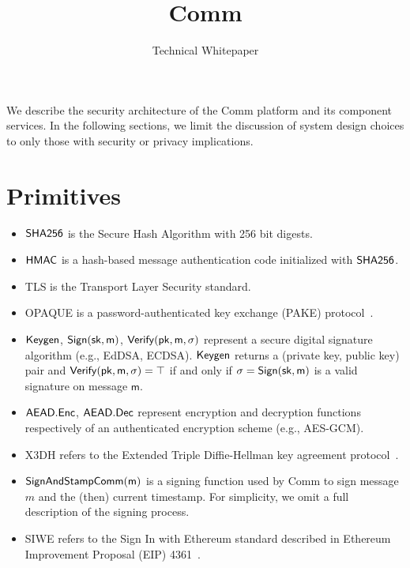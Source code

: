 \documentclass{article}
\title{Comm}
\author{Technical Whitepaper}
\date{}
\newcommand{\sk}{{\sf sk}}
\newcommand{\pk}{{\sf pk}}
\newcommand{\hmac}{\sf HMAC}
\newcommand{\keygen}{\sf Keygen}
\newcommand{\sign}{\sf Sign}
\newcommand{\signcomm}{\sf SignAndStampComm}
\newcommand{\verify}{\sf Verify}
\newcommand{\sha}{\sf SHA256}
\newcommand{\aesenc}{\sf AEAD.Enc}
\newcommand{\aesdec}{\sf AEAD.Dec}
\begin{document}
\maketitle

\noindent We describe the security architecture of the Comm platform and its component services. In the following sections, we limit the discussion of system design choices to only those with security or privacy implications.

\section*{Primitives}
\begin{itemize}
    \item $\sha$ is the Secure Hash Algorithm with 256 bit digests.
    \item $\hmac$ is a hash-based message authentication code initialized with $\sha$.
    \item TLS is the Transport Layer Security standard.
    \item OPAQUE is a password-authenticated key exchange (PAKE) protocol~\cite{opaque2018}.
    \item $\keygen$, $\sign(\sk, m)$, $\verify(\pk, m, \sigma)$ represent a secure digital signature algorithm (e.g., EdDSA, ECDSA). $\keygen$ returns a (private key, public key) pair and $\verify(\pk, m, \sigma) = \top$ if and only if  $\sigma = \sign(\sk, m)$ is a valid signature on message $\textsf{m}$.
    \item $\aesenc$, $\aesdec$ represent encryption and decryption functions respectively of an authenticated encryption scheme (e.g., AES-GCM).
    \item X3DH refers to the Extended Triple Diffie-Hellman key agreement protocol~\cite{x3dh}.
    \item $\signcomm(m)$ is a signing function used by Comm to sign message $m$ and the (then) current timestamp. For simplicity, we omit a full description of the signing process.
    \item SIWE refers to the Sign In with Ethereum standard described in Ethereum Improvement Proposal (EIP) 4361~\cite{siwe}.
\end{itemize}
\end{document}
